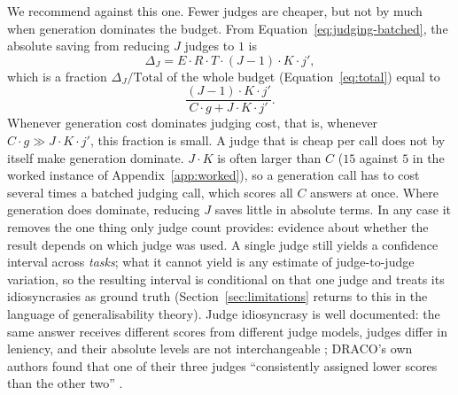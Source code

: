 \documentclass[11pt]{article}
\begin{document}
We recommend against this one. Fewer judges are cheaper, but not by much when generation dominates the budget. From Equation~\ref{eq:judging-batched}, the absolute saving from reducing $J$ judges to $1$ is
\begin{equation}
\Delta_J = E \cdot R \cdot T \cdot (J-1) \cdot K \cdot j',
\label{eq:s5}
\end{equation}
which is a fraction $\Delta_J / \text{Total}$ of the whole budget (Equation~\ref{eq:total})
equal to
\begin{equation}
\frac{(J-1) \cdot K \cdot j'}{C \cdot g + J \cdot K \cdot j'}.
\label{eq:s5frac}
\end{equation}
Whenever generation cost dominates judging cost, that is, whenever $C \cdot g \gg J \cdot K \cdot j'$, this fraction is small. A judge that is cheap per call does not by itself make generation dominate. $J \cdot K$ is often larger than $C$ ($15$ against $5$ in the worked instance of Appendix~\ref{app:worked}), so a generation call has to cost several times a batched judging call, which scores all $C$ answers at once. Where generation does dominate, reducing $J$ saves little in absolute terms. In any case it removes the one thing only judge count provides: evidence about whether the result depends on which judge was used. A single judge still yields a confidence interval
across \emph{tasks}; what it cannot yield is any estimate of judge-to-judge variation, so
the resulting interval is conditional on that one judge and treats its idiosyncrasies as
ground truth (Section~\ref{sec:limitations} returns to this in the language of
generalisability theory). Judge idiosyncrasy is well documented: the same answer receives
different scores from different judge models, judges differ in leniency, and their
absolute levels are not interchangeable \citep{thakur2025judging, zheng2023judging};
DRACO's own authors found that one of their three judges ``consistently assigned lower
scores than the other two'' \citep{draco2026}.
\end{document}
